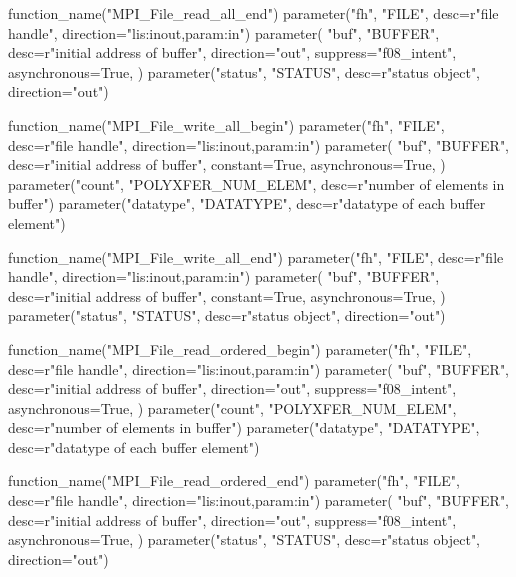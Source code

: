%
%
\begin{mpi-binding}
    function_name("MPI_File_read_all_end")
    parameter("fh", "FILE", desc=r"file handle", direction="lis:inout,param:in")
    parameter(
        "buf",
        "BUFFER",
        desc=r"initial address of buffer",
        direction="out",
        suppress="f08_intent",
        asynchronous=True,
    )
    parameter("status", "STATUS", desc=r"status object", direction="out")
\end{mpi-binding}

%
\begin{mpi-binding}
    function_name("MPI_File_write_all_begin")
    parameter("fh", "FILE", desc=r"file handle", direction="lis:inout,param:in")
    parameter(
        "buf",
        "BUFFER",
        desc=r"initial address of buffer",
        constant=True,
        asynchronous=True,
    )
    parameter("count", "POLYXFER_NUM_ELEM", desc=r"number of elements in buffer")
    parameter("datatype", "DATATYPE", desc=r"datatype of each buffer element")
\end{mpi-binding}

%
%
\begin{mpi-binding}
    function_name("MPI_File_write_all_end")
    parameter("fh", "FILE", desc=r"file handle", direction="lis:inout,param:in")
    parameter(
        "buf",
        "BUFFER",
        desc=r"initial address of buffer",
        constant=True,
        asynchronous=True,
    )
    parameter("status", "STATUS", desc=r"status object", direction="out")
\end{mpi-binding}


%
\begin{mpi-binding}
    function_name("MPI_File_read_ordered_begin")
    parameter("fh", "FILE", desc=r"file handle", direction="lis:inout,param:in")
    parameter(
        "buf",
        "BUFFER",
        desc=r"initial address of buffer",
        direction="out",
        suppress="f08_intent",
        asynchronous=True,
    )
    parameter("count", "POLYXFER_NUM_ELEM", desc=r"number of elements in buffer")
    parameter("datatype", "DATATYPE", desc=r"datatype of each buffer element")
\end{mpi-binding}

%
%
\begin{mpi-binding}
    function_name("MPI_File_read_ordered_end")
    parameter("fh", "FILE", desc=r"file handle", direction="lis:inout,param:in")
    parameter(
        "buf",
        "BUFFER",
        desc=r"initial address of buffer",
        direction="out",
        suppress="f08_intent",
        asynchronous=True,
    )
    parameter("status", "STATUS", desc=r"status object", direction="out")
\end{mpi-binding}

